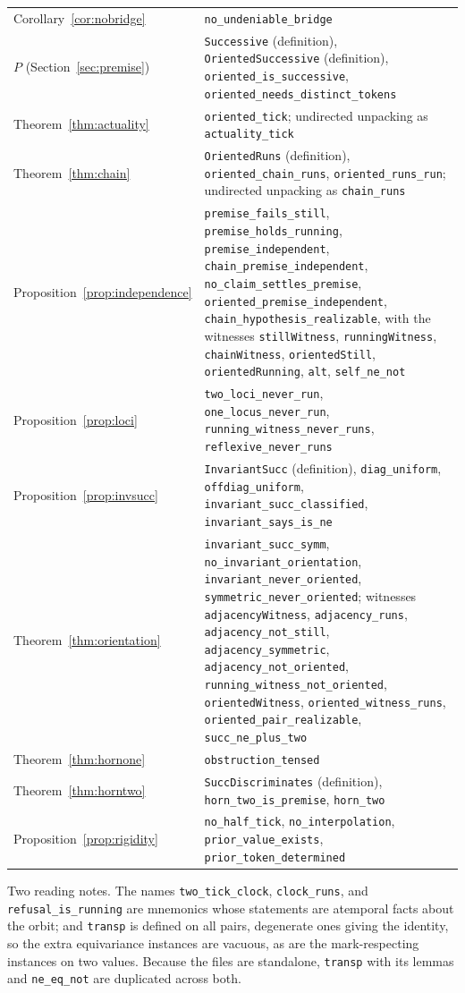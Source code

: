 \documentclass[11pt]{article}
\newcommand{\lf}[1]{\texttt{#1}}
\begin{document}
\begin{longtable}{@{}p{4.4cm}p{9.6cm}@{}}
Corollary~\ref{cor:nobridge} & \lf{no\_undeniable\_bridge} \\
$P$ (Section~\ref{sec:premise}) & \lf{Successive} (definition), \lf{OrientedSuccessive} (definition), \lf{oriented\_is\_successive}, \lf{oriented\_needs\_distinct\_tokens} \\
Theorem~\ref{thm:actuality} & \lf{oriented\_tick}; undirected unpacking as \lf{actuality\_tick} \\
Theorem~\ref{thm:chain} & \lf{OrientedRuns} (definition), \lf{oriented\_chain\_runs}, \lf{oriented\_runs\_run}; undirected unpacking as \lf{chain\_runs} \\
Proposition~\ref{prop:independence} & \lf{premise\_fails\_still}, \lf{premise\_holds\_running}, \lf{premise\_independent}, \lf{chain\_premise\_independent}, \lf{no\_claim\_settles\_premise}, \lf{oriented\_premise\_independent}, \lf{chain\_hypothesis\_realizable}, with the witnesses \lf{stillWitness}, \lf{runningWitness}, \lf{chainWitness}, \lf{orientedStill}, \lf{orientedRunning}, \lf{alt}, \lf{self\_ne\_not} \\
Proposition~\ref{prop:loci} & \lf{two\_loci\_never\_run}, \lf{one\_locus\_never\_run}, \lf{running\_witness\_never\_runs}, \lf{reflexive\_never\_runs} \\
Proposition~\ref{prop:invsucc} & \lf{InvariantSucc} (definition), \lf{diag\_uniform}, \lf{offdiag\_uniform}, \lf{invariant\_succ\_classified}, \lf{invariant\_says\_is\_ne} \\
Theorem~\ref{thm:orientation} & \lf{invariant\_succ\_symm}, \lf{no\_invariant\_orientation}, \lf{invariant\_never\_oriented}, \lf{symmetric\_never\_oriented}; witnesses \lf{adjacencyWitness}, \lf{adjacency\_runs}, \lf{adjacency\_not\_still}, \lf{adjacency\_symmetric}, \lf{adjacency\_not\_oriented}, \lf{running\_witness\_not\_oriented}, \lf{orientedWitness}, \lf{oriented\_witness\_runs}, \lf{oriented\_pair\_realizable}, \lf{succ\_ne\_plus\_two} \\
Theorem~\ref{thm:hornone} & \lf{obstruction\_tensed} \\
Theorem~\ref{thm:horntwo} & \lf{SuccDiscriminates} (definition), \lf{horn\_two\_is\_premise}, \lf{horn\_two} \\
Proposition~\ref{prop:rigidity} & \lf{no\_half\_tick}, \lf{no\_interpolation}, \lf{prior\_value\_exists}, \lf{prior\_token\_determined} \\
\bottomrule
\end{longtable}
\normalsize

Two reading notes. The names \lf{two\_tick\_clock}, \lf{clock\_runs}, and \lf{refusal\_is\_running} are mnemonics whose statements are atemporal facts about the orbit; and \lf{transp} is defined on all pairs, degenerate ones giving the identity, so the extra equivariance instances are vacuous, as are the mark-respecting instances on two values. Because the files are standalone, \lf{transp} with its lemmas and \lf{ne\_eq\_not} are duplicated across both.
\end{document}
